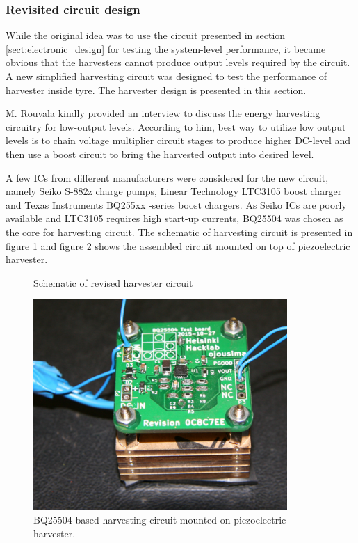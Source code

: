 \subsubsection{Revisited circuit design}
While the original idea was to use the circuit presented in section \ref{sect:electronic_design} for testing the system-level performance, it became obvious that the harvesters cannot produce output levels required by the circuit. A new simplified harvesting circuit was designed to test the performance of harvester inside tyre. The harvester design is presented in this section.

M. Rouvala kindly provided an interview \cite{Rouvala2015} to discuss the energy harvesting circuitry for low-output levels. According to him, best way to utilize low output levels is to chain voltage multiplier circuit stages to produce higher DC-level and then use a boost circuit to bring the harvested output into desired level. 

A few ICs from different manufacturers were considered for the new circuit, namely Seiko S-882z \cite{SeikoInstruments2010} charge pumps, Linear Technology LTC3105 \cite{ltc3015} boost charger and Texas Instruments BQ255xx -series boost chargers. As Seiko ICs are poorly available and LTC3105 requires high start-up currents, BQ25504 \cite{bq25504} was chosen as the core for harvesting circuit. The schematic of harvesting circuit is presented in figure \ref{fig:bq25504} and figure \ref{fig:bq25504_mounted} shows the assembled circuit mounted on top of piezoelectric harvester.


\begin{figure}
    \centering
    \def\svgwidth{\columnwidth}
    
    \caption{\label{fig:bq25504} Schematic of revised harvester circuit}
\end{figure}

\begin{figure}[htb]
\begin{center}
\includegraphics[height=8cm]{images/own_pic/tyre_fixture/piezo_bq_desk.jpg}
\end{center}
\caption{\label{fig:bq25504_mounted} BQ25504-based harvesting circuit mounted on piezoelectric harvester.}
\end{figure}

